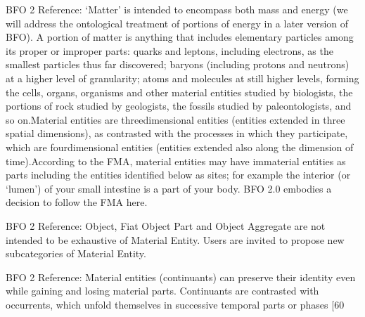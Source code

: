 \documentclass[letterpaper,10pt,english]{sphinxmanual}
\begin{document}
\begin{sphinxShadowBox}

\sphinxAtStartPar
BFO 2 Reference: ‘Matter’ is intended to encompass both mass and energy (we will address the ontological treatment of portions of energy in a later version of BFO). A portion of matter is anything that includes elementary particles among its proper or improper parts: quarks and leptons, including electrons, as the smallest particles thus far discovered; baryons (including protons and neutrons) at a higher level of granularity; atoms and molecules at still higher levels, forming the cells, organs, organisms and other material entities studied by biologists, the portions of rock studied by geologists, the fossils studied by paleontologists, and so on.Material entities are three\sphinxhyphen{}dimensional entities (entities extended in three spatial dimensions), as contrasted with the processes in which they participate, which are four\sphinxhyphen{}dimensional entities (entities extended also along the dimension of time).According to the FMA, material entities may have immaterial entities as parts \textendash{} including the entities identified below as sites; for example the interior (or ‘lumen’) of your small intestine is a part of your body. BFO 2.0 embodies a decision to follow the FMA here.

\sphinxAtStartPar
BFO 2 Reference: Object, Fiat Object Part and Object Aggregate are not intended to be exhaustive of Material Entity. Users are invited to propose new subcategories of Material Entity.

\sphinxAtStartPar
BFO 2 Reference: Material entities (continuants) can preserve their identity even while gaining and losing material parts. Continuants are contrasted with occurrents, which unfold themselves in successive temporal parts or phases {[}60
\end{sphinxShadowBox}

\begin{sphinxShadowBox}

\sphinxAtStartPar
{}
\end{sphinxShadowBox}
\begin{quote}

\ignorespaces \end{quote}
\end{document}
